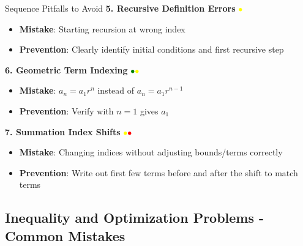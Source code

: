 \documentclass{article}
\begin{document}
\begin{trapbox}{Sequence Pitfalls to Avoid}
\textbf{5. Recursive Definition Errors} \textcolor{yellow}{$\bullet$}
\begin{itemize}[nosep]
\item \textbf{Mistake}: Starting recursion at wrong index
\item \textbf{Prevention}: Clearly identify initial conditions and first recursive step
\end{itemize}
\textbf{6. Geometric Term Indexing} \textcolor{green}{$\bullet$}\textcolor{yellow}{$\bullet$}
\begin{itemize}[nosep]
\item \textbf{Mistake}: $a_n = a_1 r^{n}$ instead of $a_n = a_1 r^{n-1}$
\item \textbf{Prevention}: Verify with $n=1$ gives $a_1$
\end{itemize}
\textbf{7. Summation Index Shifts} \textcolor{yellow}{$\bullet$}\textcolor{red}{$\bullet$}
\begin{itemize}[nosep]
\item \textbf{Mistake}: Changing indices without adjusting bounds/terms correctly
\item \textbf{Prevention}: Write out first few terms before and after the shift to match terms
\end{itemize}
\end{trapbox}

\subsection{Inequality and Optimization Problems - Common Mistakes}
\end{document}
